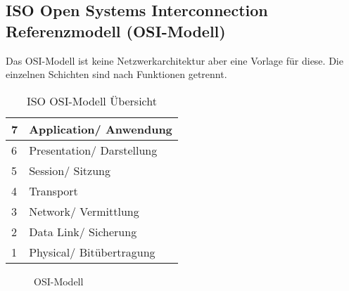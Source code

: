 \subsection{ISO Open Systems Interconnection Referenzmodell (OSI-Modell)}

Das OSI-Modell ist keine Netzwerkarchitektur aber eine Vorlage für diese. Die einzelnen Schichten sind nach Funktionen getrennt.

\begin{table}[H]
    \centering
    \begin{tabular}{|l|l|}
        \hline
        7 & Application/ Anwendung    \\\hline
        6 & Presentation/ Darstellung \\\hline
        5 & Session/ Sitzung          \\\hline
        4 & Transport                 \\\hline
        3 & Network/ Vermittlung      \\\hline
        2 & Data Link/ Sicherung      \\\hline
        1 & Physical/ Bitübertragung  \\\hline
    \end{tabular}
    \caption{ISO OSI-Modell Übersicht}
\end{table}

\begin{figure}[H]
    \centering
    
    \caption{OSI-Modell}
\end{figure}
\FloatBarrier


